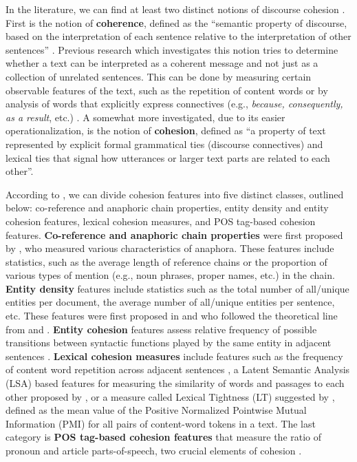 \documentclass{clv3}
\begin{document}
In the literature, we can find at least two distinct notions of discourse cohesion \citep{todirascu-etal-2016-cohesive}. First is the notion of \textbf{coherence}, defined as the ``semantic property of discourse, based on the interpretation of each sentence relative to the interpretation of other sentences'' \citep{van1977text}. Previous research which investigates this notion tries to determine whether a text can be interpreted as a coherent message and not just as a collection of unrelated sentences. This can be done by measuring certain observable features of the text, such as the repetition of content words or by analysis of words that explicitly express connectives (e.g., \textit{because, consequently, as a result}, etc.) \citep{sheehan2014textevaluator}. A somewhat more investigated, due to its easier operationalization, is the notion of \textbf{cohesion}, defined as ``a property of text represented by explicit formal grammatical ties (discourse connectives) and lexical ties that signal how utterances or larger text parts are related to each other''. 

According to \citet{todirascu-etal-2016-cohesive}, we can divide cohesion features into five distinct classes, outlined below: co-reference and anaphoric chain properties, entity density and entity cohesion features, lexical cohesion measures, and POS tag-based cohesion features.
\textbf{Co-reference and anaphoric chain properties} were first proposed by \citet{bormuth1969development}, who measured various characteristics of anaphora. These features include statistics, such as the average length of reference chains or the proportion of various types of mention (e.g., noun phrases, proper names, etc.) in the chain. \textbf{Entity density} features include statistics such as the total number of all/unique entities per document, the average number of all/unique entities per sentence, etc. These features were first proposed in \citet{feng2009cognitively} and \citet{feng2010comparison} who followed the theoretical line from \citet{halliday1976cohesion} and \citet{williams2006michael}. \textbf{Entity cohesion} features assess relative frequency of possible transitions between syntactic functions played by the same entity in adjacent sentences \citep{pitler2008revisiting}. \textbf{Lexical cohesion measures} include features such as the frequency of content word repetition across adjacent sentences \citep{sheehan2014textevaluator}, a Latent Semantic Analysis (LSA) based features for measuring the similarity of words and passages to each other proposed by \citet{landauer2011pearson}, or a measure called Lexical Tightness (LT) suggested by \citet{flor2013lexical}, defined as the mean value of the Positive Normalized Pointwise Mutual Information (PMI) for all pairs of content-word tokens in a text. The last category is \textbf{POS tag-based cohesion features} that measure the ratio of pronoun and article parts-of-speech, two crucial elements of cohesion \citep{todirascu-etal-2016-cohesive}.
\end{document}
